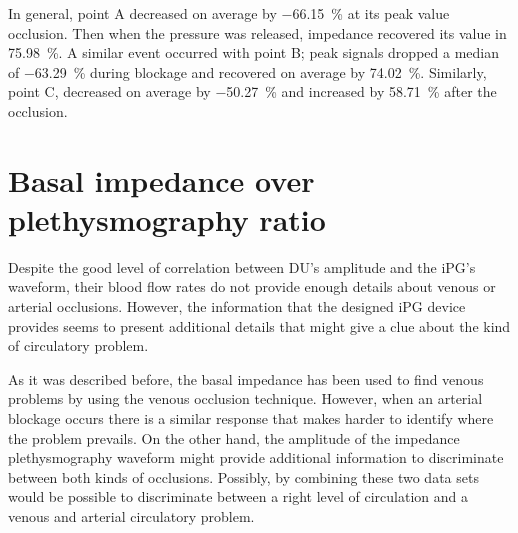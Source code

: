 In general, point A decreased on average by \SI{-66.15}{\percent} at its peak value occlusion. Then when the pressure was released, impedance recovered its value in \SI{75.98}{\percent}. A similar event occurred with point B; peak signals dropped a median of \SI{-63.29}{\percent} during blockage and recovered on average by \SI{74.02}{\percent}. Similarly, point C, decreased on average by \SI{-50.27}{\percent}  and increased by \SI{58.71}{\percent} after the occlusion.

\section{Basal impedance over plethysmography ratio} %
\label{section discussion 4}

Despite the good level of correlation between DU's amplitude and the iPG's waveform, their blood flow rates do not provide enough details about venous or arterial occlusions. However, the information that the designed iPG device provides seems to present additional details that might give a clue about the kind of circulatory problem. 

As it was described before, the basal impedance has been used to find venous problems by using the venous occlusion technique. However, when an arterial blockage occurs there is a similar response that makes harder to identify where the problem prevails. On the other hand, the amplitude of the impedance plethysmography waveform might provide additional information to discriminate between both kinds of occlusions. Possibly, by combining these two data sets would be possible to discriminate between a right level of circulation and a venous and arterial circulatory problem. 

